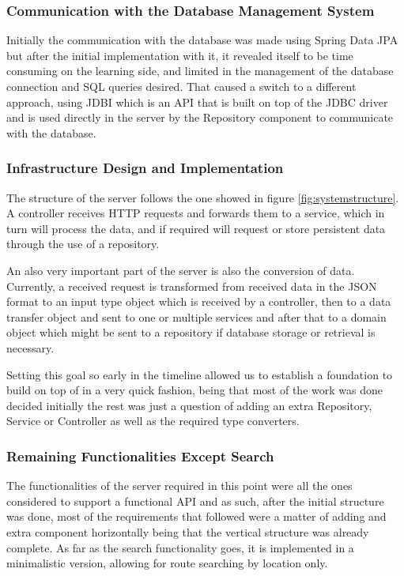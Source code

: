 \documentclass{article}
\begin{document}
            \subsubsection*{Communication with the Database Management System}
            Initially the communication with the database was made using Spring Data JPA \cite{springjpadocs} but after the initial implementation with it, it revealed 
            itself to be time consuming on the learning side, and limited in the management of the database connection and SQL queries desired. 
            That caused a switch to a different approach, using JDBI \cite{jdbidocs} which is an API that is built on top of the JDBC driver \cite{jdbcdocs} and is used directly in 
            the server by the Repository component to communicate with the database.        

            \subsubsection*{Infrastructure Design and Implementation}
            The structure of the server follows the one showed in figure \ref{fig:systemstructure}. A controller receives HTTP requests and forwards them to a service, which in turn will process the data, and if required will
            request or store persistent data through the use of a repository.\par
            An also very important part of the server is also the conversion of data. Currently, a received request is transformed from received data in the JSON format to an input type object which is received by a controller, then to a data 
            transfer object and sent to one or multiple services and after that to a domain object which might be sent to a repository if database storage or retrieval is necessary.\par
            Setting this goal so early in the timeline allowed us to establish a foundation to build on top of in a very quick fashion, being that most of the work was done decided initially the rest 
            was just a question of adding an extra Repository, Service or Controller as well as the required type converters. 

            \subsubsection*{Remaining Functionalities Except Search}
            The functionalities of the server required in this point were all the ones considered to support a functional API and as such, after the initial structure was done, most of the requirements
            that followed were a matter of adding and extra component horizontally being that the vertical structure was already complete. As far as the search functionality goes, it is implemented in 
            a minimalistic version, allowing for route searching by location only.
\end{document}
